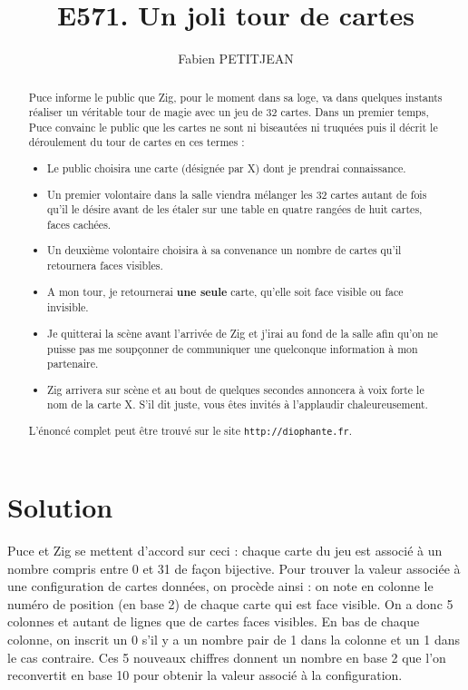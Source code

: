 \documentclass[10pt,a4paper,onecolumn]{article}
\author{Fabien PETITJEAN}
\title{E571. Un joli tour de cartes}
\begin{document}
\maketitle
\begin{abstract}
Puce informe le public que Zig, pour le moment dans sa loge, va dans quelques instants réaliser un véritable tour de magie avec un jeu de 32 cartes.
Dans un premier temps, Puce convainc le public que les cartes ne sont ni biseautées ni truquées puis il décrit le déroulement du tour de cartes en ces termes :
{\it
\begin{itemize}
\item Le public choisira une carte (désignée par X) dont je prendrai connaissance.
\item Un premier volontaire dans la salle viendra mélanger les 32 cartes autant de fois qu’il le désire avant de les étaler sur une table en quatre rangées de huit cartes, faces cachées.
\item Un deuxième volontaire choisira à sa convenance un nombre de cartes qu’il retournera faces visibles.
\item A mon tour, je retournerai {\bf une seule} carte, qu’elle soit face visible ou face invisible.
\item Je quitterai la scène avant l’arrivée de Zig et j’irai au fond de la salle afin qu’on ne puisse pas me soupçonner de communiquer une quelconque information à mon partenaire.
\item Zig arrivera sur scène et au bout de quelques secondes annoncera à voix forte le nom de la carte X. S’il dit juste, vous êtes invités à l’applaudir chaleureusement.
\end{itemize}
}


\vspace{6mm}\noindent L'énoncé complet peut être trouvé sur le site {\tt http://diophante.fr}.
\end{abstract}

\section{Solution}
Puce et Zig se mettent d'accord sur ceci : chaque carte du jeu est associé à un nombre compris entre 0 et 31 de façon bijective. Pour trouver la valeur associée à une configuration de cartes données, on procède ainsi : on note en colonne le numéro de position (en base 2) de chaque carte qui est face visible. On a donc 5 colonnes et autant de lignes que de cartes faces visibles.
En bas de chaque colonne, on inscrit un 0 s'il y a un nombre pair de 1 dans la colonne et un 1 dans le cas contraire. Ces 5 nouveaux chiffres donnent un nombre en base 2 que l'on reconvertit en base 10 pour obtenir la valeur associé à la configuration.
\end{document}
